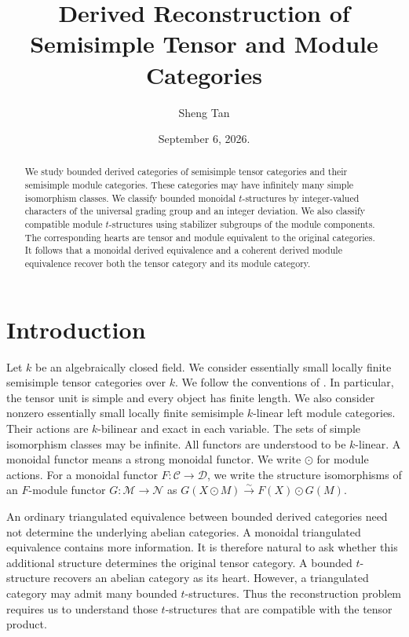 \documentclass[11pt]{amsart}
\title[Derived Reconstruction]{Derived Reconstruction of Semisimple Tensor and Module Categories}
\author{Sheng Tan}
\date{September 6, 2026.}
\newcommand{\C}{\mathcal C}
\newcommand{\D}{\mathcal D}
\newcommand{\M}{\mathcal M}
\newcommand{\N}{\mathcal N}
\theoremstyle{definition}
\theoremstyle{remark}
\theoremstyle{plain}
\begin{document}
\begin{abstract}
We study bounded derived categories of semisimple tensor categories and their semisimple module categories. These categories may have infinitely many simple isomorphism classes. We classify bounded monoidal $t$-structures by integer-valued characters of the universal grading group and an integer deviation. We also classify compatible module $t$-structures using stabilizer subgroups of the module components. The corresponding hearts are tensor and module equivalent to the original categories. It follows that a monoidal derived equivalence and a coherent derived module equivalence recover both the tensor category and its module category.
\end{abstract}

\maketitle

\section{Introduction}

Let $k$ be an algebraically closed field. We consider essentially small locally finite semisimple tensor categories over $k$. We follow the conventions of \cite{EGNO}. In particular, the tensor unit is simple and every object has finite length. We also consider nonzero essentially small locally finite semisimple $k$-linear left module categories. Their actions are $k$-bilinear and exact in each variable. The sets of simple isomorphism classes may be infinite. All functors are understood to be $k$-linear. A monoidal functor means a strong monoidal functor. We write $\odot$ for module actions. For a monoidal functor $F:\C\to\D$, we write the structure isomorphisms of an $F$-module functor $G:\M\to\N$ as $G(X\odot M)\xrightarrow{\sim}F(X)\odot G(M)$.

An ordinary triangulated equivalence between bounded derived categories need not determine the underlying abelian categories. A monoidal triangulated equivalence contains more information. It is therefore natural to ask whether this additional structure determines the original tensor category. A bounded $t$-structure recovers an abelian category as its heart. However, a triangulated category may admit many bounded $t$-structures. Thus the reconstruction problem requires us to understand those $t$-structures that are compatible with the tensor product.
\end{document}
